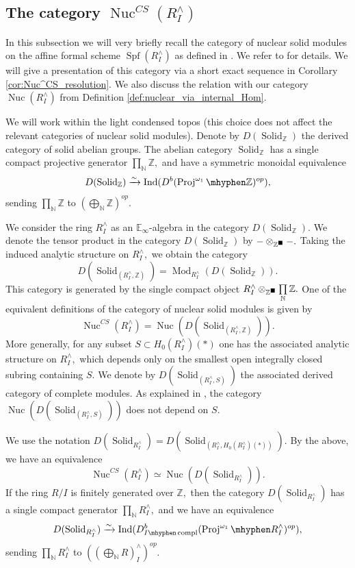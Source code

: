 \documentclass[11pt,leqno]{amsart}
\numberwithin{equation}{section}
\def\N{\mathbb{N}}
\def\Z{\mathbb{Z}}
\newcommand{\tens}[1]{%
  \mathbin{\mathop{\otimes}\displaylimits_{#1}}%
}
\newcommand{\hy}{\mhyphen}
\newcommand{\biggplus}[1][]{\mathop{\bigoplus}\limits_{#1}}
\newcommand{\prodd}[1][]{\mathop{\prod}\limits_{#1}}
\newcommand{\xto}{\xrightarrow}
\newcommand{\Nuc}{\operatorname{Nuc}}
\newcommand{\Solid}{\operatorname{Solid}}
\newcommand{\Proj}{\operatorname{Proj}}
\newcommand{\bE}{{\mathbb E}}
\newcommand{\Ind}{\operatorname{Ind}}
\newcommand{\Spf}{\operatorname{Spf}}
\newcommand{\compl}{\operatorname{compl}}
\newcommand{\Mod}{\operatorname{Mod}}
\newcommand{\bs}{\blacksquare}
\begin{document}
\subsection{The category $\Nuc^{CS}(R^{\wedge}_{I})$} In this subsection we will very briefly recall the category of nuclear solid modules on the affine formal scheme $\Spf(R^{\wedge}_I)$ as defined in \cite{CS20}. We refer to \cite{CS20, And23, AM24} for details. We will give a presentation of this category via a short exact sequence in Corollary \ref{cor:Nuc^CS_resolution}. We also discuss the relation with our category $\Nuc(R^{\wedge}_I)$ from Definition \ref{def:nuclear_via_internal_Hom}.   

We will work within the light condensed topos \cite{CS24} (this choice does not affect the relevant categories of nuclear solid modules). Denote by $D(\Solid_{\Z})$ the derived category of solid abelian groups. The abelian category $\Solid_{\Z}$ has a single compact projective generator $\prodd[\N]\Z,$ and have a symmetric monoidal equivalence
\begin{equation*}
D(\Solid_{\Z})\xto{\sim}\Ind(D^b(\Proj^{\omega_1}\hy\Z)^{op}),
\end{equation*}
sending $\prodd[\N]\Z$ to $(\biggplus[\N]\Z)^{op}.$

We consider the ring $R^{\wedge}_{I}$ as an $\bE_{\infty}$-algebra in the category $D(\Solid_{\Z}).$ We denote the tensor product in the category $D(\Solid_{\Z})$ by $-\tens{\Z^{\bs}}-.$ Taking the induced analytic structure on $R^{\wedge}_I,$ we obtain the category
$$D(\Solid_{(R^{\wedge}_I,\Z)})=\Mod_{R^{\wedge}_I}(D(\Solid_{\Z})).$$ This category is generated by the single compact object $R^{\wedge}_I\tens{\Z^{\bs}}\prodd[\N]\Z.$ 
One of the equivalent definitions of the category of nuclear solid modules is given by
\begin{equation*}
\Nuc^{CS}(R^{\wedge}_I)=\Nuc(D(\Solid_{(R^{\wedge}_I,\Z)})).
\end{equation*}
More generally, for any subset $S\subset H_0(R^{\wedge}_I)(\ast)$ one has the associated analytic structure on $R^{\wedge}_{I},$ which depends only on the smallest open integrally closed subring containing $S.$ We denote by $D(\Solid_{(R^{\wedge}_I,S)})$ the associated derived category of complete modules. As explained in \cite[Example 3.34]{AM24}, the category $\Nuc(D(\Solid_{(R^{\wedge}_I,S)}))$ does not depend on $S.$

We use the notation $D(\Solid_{R^{\wedge}_I})=D(\Solid_{(R^{\wedge}_I,H_0(R^{\wedge}_I)(\ast))}).$ By the above, we have an equivalence
\begin{equation*}
\Nuc^{CS}(R^{\wedge}_I)\simeq \Nuc(D(\Solid_{R^{\wedge}_I})).
\end{equation*} 
If the ring $R/I$ is finitely generated over $\Z,$ then the category $D(\Solid_{R^{\wedge}_I})$ has a single compact generator $\prodd[\N]R^{\wedge}_I,$ and we have an equivalence
\begin{equation*}
D(\Solid_{R^{\wedge}_I})\xto{\sim}\Ind(D^b_{I\hy\compl}(\Proj^{\omega_1}\hy R^{\wedge}_I)^{op}),
\end{equation*}
sending $\prodd[\N]R^{\wedge}_I$ to $((\biggplus[\N]R)^{\wedge}_I)^{op}.$
\end{document}
